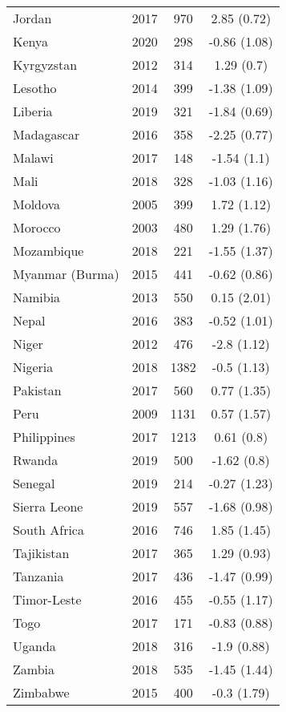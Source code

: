 \begin{tabular}{l ccc}
 Jordan & 2017 & 970 & 2.85 (0.72)  \\ 
 Kenya & 2020 & 298 & -0.86 (1.08)  \\ 
 Kyrgyzstan & 2012 & 314 & 1.29 (0.7)  \\ 
 Lesotho & 2014 & 399 & -1.38 (1.09)  \\ 
 Liberia & 2019 & 321 & -1.84 (0.69)  \\ 
 Madagascar & 2016 & 358 & -2.25 (0.77)  \\ 
 Malawi & 2017 & 148 & -1.54 (1.1)  \\ 
 Mali & 2018 & 328 & -1.03 (1.16)  \\ 
 Moldova & 2005 & 399 & 1.72 (1.12)  \\ 
 Morocco & 2003 & 480 & 1.29 (1.76)  \\ 
 Mozambique & 2018 & 221 & -1.55 (1.37)  \\ 
 Myanmar (Burma) & 2015 & 441 & -0.62 (0.86)  \\ 
 Namibia & 2013 & 550 & 0.15 (2.01)  \\ 
 Nepal & 2016 & 383 & -0.52 (1.01)  \\ 
 Niger & 2012 & 476 & -2.8 (1.12)  \\ 
 Nigeria & 2018 & 1382 & -0.5 (1.13)  \\ 
 Pakistan & 2017 & 560 & 0.77 (1.35)  \\ 
 Peru & 2009 & 1131 & 0.57 (1.57)  \\ 
 Philippines & 2017 & 1213 & 0.61 (0.8)  \\ 
 Rwanda & 2019 & 500 & -1.62 (0.8)  \\ 
 Senegal & 2019 & 214 & -0.27 (1.23)  \\ 
 Sierra Leone & 2019 & 557 & -1.68 (0.98)  \\ 
 South Africa & 2016 & 746 & 1.85 (1.45)  \\ 
 Tajikistan & 2017 & 365 & 1.29 (0.93)  \\ 
 Tanzania & 2017 & 436 & -1.47 (0.99)  \\ 
 Timor-Leste & 2016 & 455 & -0.55 (1.17)  \\ 
 Togo & 2017 & 171 & -0.83 (0.88)  \\ 
 Uganda & 2018 & 316 & -1.9 (0.88)  \\ 
 Zambia & 2018 & 535 & -1.45 (1.44)  \\ 
 Zimbabwe & 2015 & 400 & -0.3 (1.79)  \\ 
 \hline 
\end{tabular}